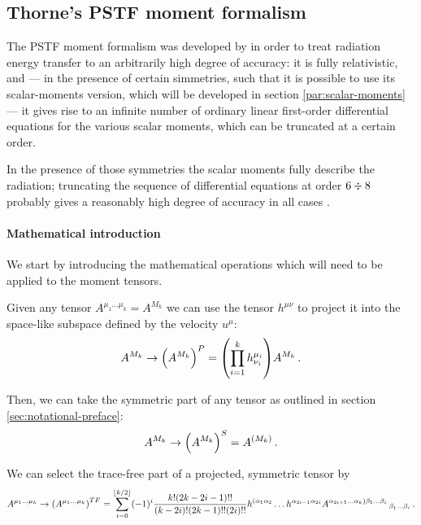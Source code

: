 \documentclass[main.tex]{subfiles}
\begin{document}
\subsection{Thorne's PSTF moment formalism}

The PSTF moment formalism was developed by \textcite{Thorne:1981feb} in order to treat radiation energy transfer to an arbitrarily high degree of accuracy: it is fully relativistic, and --- in the presence of certain simmetries, such that it is possible to use its scalar-moments version, which will be developed in section \ref{par:scalar-moments} --- it gives rise to an infinite number of ordinary linear first-order differential equations for the various scalar moments, which can be truncated at a certain order.

In the presence of those symmetries the scalar moments fully describe the radiation; truncating the sequence of differential equations at order \(6 \divisionsymbol 8\) probably gives a reasonably high degree of accuracy in all cases \cite[p. 1285]{TurollaNobili:1988}.

\paragraph{Mathematical introduction}

We start by introducing the mathematical operations which will need to be applied to the moment tensors.

Given any tensor \(A^{\mu_1 \dots \mu_k} = A^{M_k}\) we can use the tensor \(h^{\mu\nu}\) to project it into the space-like subspace defined by the velocity \(u^\mu\):
\begin{equation}
    A^{M_k} \rightarrow \qty(A^{M_k})^P
    = \qty(\prod_{i=1}^k h^{\mu_i}_{\nu_i}) A^{M_k} \,.
\end{equation}

Then, we can take the symmetric part of any tensor as outlined in section \ref{sec:notational-preface}:
\begin{equation}
    A^{M_k} \rightarrow \qty(A^{M_k})^S
    = A^{(M_k)} \,.
\end{equation}

We can select the trace-free part of a projected, symmetric tensor by
\begin{equation}
    A^{\mu_1 \dots \mu_k} \rightarrow \qty(A^{\mu_1 \dots \mu_k})^{TF}
    = \sum _{i=0}   ^{\lfloor k/2 \rfloor}
    (-1)^i \frac{k! (2k-2i-1)!!}{(k-2i)! (2k-1)!! (2i)!!}
    h^{(\alpha_1 \alpha_2} \dots h^{\alpha_{2i-1} \alpha_{2i}}
    A^{\alpha_{2i+1} \dots \alpha_k) \beta_1 \dots \beta_i}\,_{\beta_1 \dots \beta_i} \,.
\end{equation}
\end{document}
